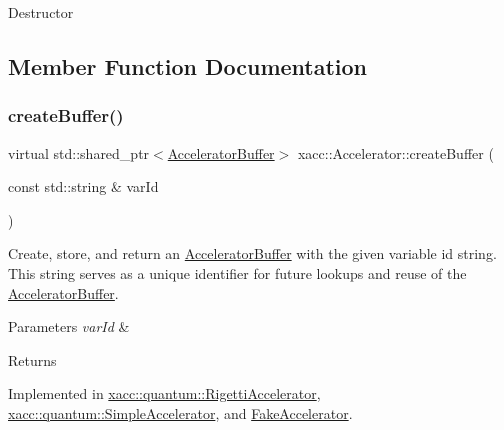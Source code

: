 Destructor 

\subsection{Member Function Documentation}
\mbox{\label{a02432_aab5046e8d83ab390302e0f49533e95fc}} 
\subsubsection{\texorpdfstring{create\+Buffer()}{createBuffer()}\hspace{0.1cm}{\footnotesize\ttfamily [1/2]}}
{\footnotesize\ttfamily virtual std\+::shared\+\_\+ptr$<$\hyperlink{a02444}{Accelerator\+Buffer}$>$ xacc\+::\+Accelerator\+::create\+Buffer (\begin{DoxyParamCaption}\item[{const std\+::string \&}]{var\+Id }\end{DoxyParamCaption})\hspace{0.3cm}{\ttfamily [pure virtual]}}

Create, store, and return an \hyperlink{a02444}{Accelerator\+Buffer} with the given variable id string. This string serves as a unique identifier for future lookups and reuse of the \hyperlink{a02444}{Accelerator\+Buffer}.


\begin{DoxyParams}{Parameters}
{\em var\+Id} & \\
\hline
\end{DoxyParams}
\begin{DoxyReturn}{Returns}

\end{DoxyReturn}


Implemented in \hyperlink{a01212_ada3ceb986e51ab5aa721f2a08e083cd6}{xacc\+::quantum\+::\+Rigetti\+Accelerator}, \hyperlink{a01244_a46445d77d4b8ad2689571d0db6604380}{xacc\+::quantum\+::\+Simple\+Accelerator}, and \hyperlink{a02496_ae39580fdc83ce9f4df0967382398950e}{Fake\+Accelerator}.

\mbox{\label{a02432_a064a2dbd58338364115c260267806945}} 
